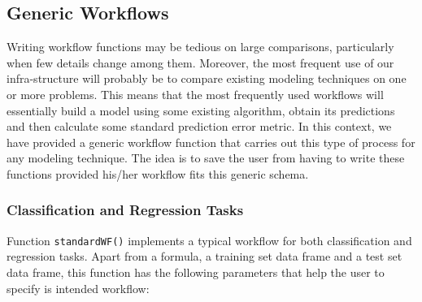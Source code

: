 \documentclass[10pt,a4paper]{article}
\begin{document}
\subsection{Generic Workflows}

Writing workflow functions may be tedious on large comparisons,
particularly when few details change among them. Moreover, the most
frequent use of our infra-structure will probably be to compare
existing modeling techniques on one or more problems. This means that
the most frequently used workflows will essentially build a model
using some existing algorithm, obtain its predictions and then
calculate some standard prediction error metric. In this context, we
have provided a generic workflow function that carries out this type
of process for any modeling technique. The idea is to save the user
from having to write these functions provided his/her workflow fits
this generic schema.

\subsubsection{Classification and Regression Tasks}

Function \texttt{standardWF()} implements a typical workflow for both
classification and regression tasks. Apart from a formula, a training set data frame and a test set data frame, this function has the following parameters that help the user to specify is intended workflow:
\end{document}
